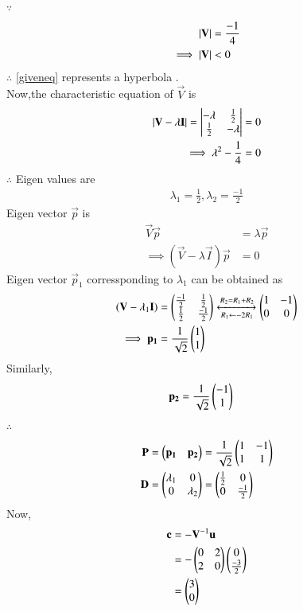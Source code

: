 \documentclass[journal,12pt,twocolumn]{IEEEtran}
\begin{document}
$\because$
\begin{align}
    \left\vert\mathbf{V}\right\vert &= \frac{-1}{4}
    \\
    \implies \left\vert\mathbf{V}\right\vert &< 0
\end{align}
$\therefore$ \eqref{giveneq} represents a hyperbola .
\\
Now,the characteristic equation of $\vec{V}$ is 
\begin{align}
    \left\vert\mathbf{V} - \lambda\mathbf{I}\right\vert = \begin{vmatrix}-\lambda & \frac{1}{2} \\ \frac{1}{2} & -\lambda\end{vmatrix} &= 0
    \\
    \implies \lambda^2 - \frac{1}{4} &= 0
\end{align}
$\therefore$ Eigen values are 
\begin{align}
    \lambda_1 = \frac{1}{2} , \lambda_2 = \frac{-1}{2}
\end{align}
Eigen vector $\vec{p}$ is 
\begin{align}
    \vec{V}\vec{p} &= \lambda\vec{p}
    \\
    \implies (\vec{V} - \lambda\vec{I})\vec{p} &= 0
\end{align}
Eigen vector $\vec{p}_1$ corressponding to $\lambda_1$ can be obtained as
\begin{align}
    (\mathbf{V} - \lambda_1\mathbf{I}) &= \begin{pmatrix}\frac{-1}{2} & \frac{1}{2} \\ \frac{1}{2} & \frac{-1}{2}\end{pmatrix}\xleftrightarrow[R_1 \leftarrow -2R_1]{R_2 = R_1 + R_2}\begin{pmatrix}1 & -1 \\ 0 & 0\end{pmatrix}
    \\
    \implies \mathbf{p_1} &= \frac{1}{\sqrt{2}}\begin{pmatrix}1 \\ 1\end{pmatrix}
\end{align}
Similarly,
\begin{align}
    \mathbf{p_2} &= \frac{1}{\sqrt{2}}\begin{pmatrix}-1 \\ 1\end{pmatrix}
\end{align}
$\therefore$
\begin{align}
    \mathbf{P} &= \begin{pmatrix}\mathbf{p_1} & \mathbf{p_2}\end{pmatrix} = \frac{1}{\sqrt{2}}\begin{pmatrix}1 & -1 \\ 1 & 1\end{pmatrix}
    \\
    \mathbf{D} &= \begin{pmatrix}\lambda_1 & 0 \\ 0 & \lambda_2\end{pmatrix} = \begin{pmatrix}\frac{1}{2} & 0 \\ 0 & \frac{-1}{2}\end{pmatrix}
\end{align}
Now,
\begin{align}
    \mathbf{c} &= -\mathbf{V}^{-1}\mathbf{u} 
    \\
    &= -\begin{pmatrix}0 & 2 \\2 & 0\end{pmatrix}\begin{pmatrix}0 \\ \frac{-3}{2}\end{pmatrix}
    \\
    &= \begin{pmatrix}3 \\ 0\end{pmatrix}
\end{align}
\end{document}
